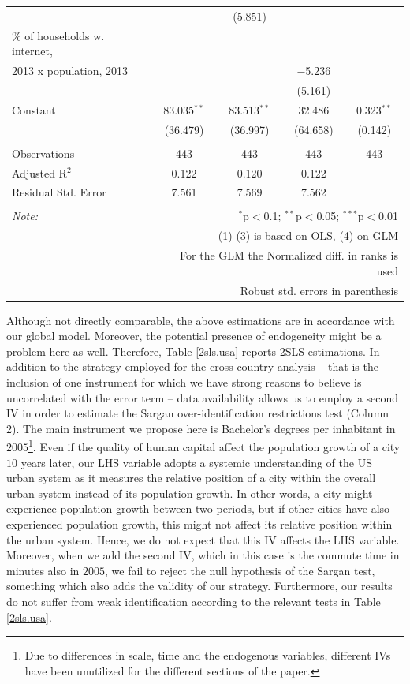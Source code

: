 \documentclass[10pt,letterpaper]{article}
\begin{document}
\begin{table}[!htbp]
\begin{tabular}{@{\extracolsep{1pt}}lcccc}
  &  & (5.851) &  &  \\ 
  \% of households w. internet, \\
                             2013 x population, 2013 &  &  & $-$5.236 &  \\ 
  &  &  & (5.161) &  \\ 
  Constant & 83.035$^{**}$ & 83.513$^{**}$ & 32.486 & 0.323$^{**}$ \\ 
  & (36.479) & (36.997) & (64.658) & (0.142) \\ 
 \hline \\[-1.8ex] 
Observations & 443 & 443 & 443 & 443 \\ 
Adjusted R$^{2}$ & 0.122 & 0.120 & 0.122 &  \\ 
Residual Std. Error & 7.561 & 7.569 & 7.562 &  \\ 
\hline 
\hline \\[-1.8ex] 
\textit{Note:}  & \multicolumn{4}{r}{$^{*}$p$<$0.1; $^{**}$p$<$0.05; $^{***}$p$<$0.01} \\ 
 & \multicolumn{4}{r}{(1)-(3) is based on OLS, (4) on GLM} \\ 
 & \multicolumn{4}{r}{For the GLM the Normalized diff. in ranks is used} \\ 
 & \multicolumn{4}{r}{Robust std. errors in parenthesis} \\ 
\end{tabular} 
\end{table}

Although not directly comparable, the above estimations are in
accordance with our global model. Moreover, the potential presence of
endogeneity might be a problem here as well. Therefore, Table
\ref{2sls.usa} reports 2SLS estimations. In addition to the strategy
employed for the cross-country analysis -- that is the inclusion of one
instrument for which we have strong reasons to believe is uncorrelated
with the error term -- data availability allows us to employ a second IV
in order to estimate the Sargan over-identification restrictions test
(Column 2). The main instrument we propose here is Bachelor's degrees
per inhabitant in \(2005\)\footnote{Due to differences in scale, time
  and the endogenous variables, different IVs have been unutilized for
  the different sections of the paper. \color{black}}. Even if the
quality of human capital affect the population growth of a city \(10\)
years later, our LHS variable adopts a systemic understanding of the US
urban system as it measures the relative position of a city within the
overall urban system instead of its population growth. In other words, a
city might experience population growth between two periods, but if
other cities have also experienced population growth, this might not
affect its relative position within the urban system. Hence, we do not
expect that this IV affects the LHS variable. Moreover, when we add the
second IV, which in this case is the commute time in minutes also in
\(2005\), we fail to reject the null hypothesis of the Sargan test,
something which also adds the validity of our strategy. Furthermore, our
results do not suffer from weak identification according to the relevant
tests in Table \ref{2sls.usa}.
\end{document}
